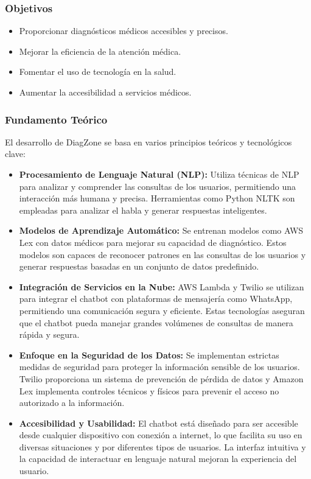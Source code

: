 \subsubsection{Objetivos}
\begin{itemize}
	\item Proporcionar diagnósticos médicos accesibles y precisos.
	\item Mejorar la eficiencia de la atención médica.
	\item Fomentar el uso de tecnología en la salud.
	\item Aumentar la accesibilidad a servicios médicos.
\end{itemize}	


\subsubsection{Fundamento Teórico}
El desarrollo de DiagZone se basa en varios principios teóricos y tecnológicos clave:

\begin{itemize}
	\item \textbf{Procesamiento de Lenguaje Natural (NLP):} Utiliza técnicas de NLP para analizar y comprender las consultas de los usuarios, permitiendo una interacción más humana y precisa. Herramientas como Python NLTK son empleadas para analizar el habla y generar respuestas inteligentes.
		
	\item \textbf{Modelos de Aprendizaje Automático:} Se entrenan modelos como AWS Lex con datos médicos para mejorar su capacidad de diagnóstico. Estos modelos son capaces de reconocer patrones en las consultas de los usuarios y generar respuestas basadas en un conjunto de datos predefinido.
	
	\item \textbf{Integración de Servicios en la Nube:} AWS Lambda y Twilio se utilizan para integrar el chatbot con plataformas de mensajería como WhatsApp, permitiendo una comunicación segura y eficiente. Estas tecnologías aseguran que el chatbot pueda manejar grandes volúmenes de consultas de manera rápida y segura.
	
	\item \textbf{Enfoque en la Seguridad de los Datos:} Se implementan estrictas medidas de seguridad para proteger la información sensible de los usuarios. Twilio proporciona un sistema de prevención de pérdida de datos y Amazon Lex implementa controles técnicos y físicos para prevenir el acceso no autorizado a la información.
	
	\item \textbf{Accesibilidad y Usabilidad:} El chatbot está diseñado para ser accesible desde cualquier dispositivo con conexión a internet, lo que facilita su uso en diversas situaciones y por diferentes tipos de usuarios. La interfaz intuitiva y la capacidad de interactuar en lenguaje natural mejoran la experiencia del usuario.
\end{itemize}

